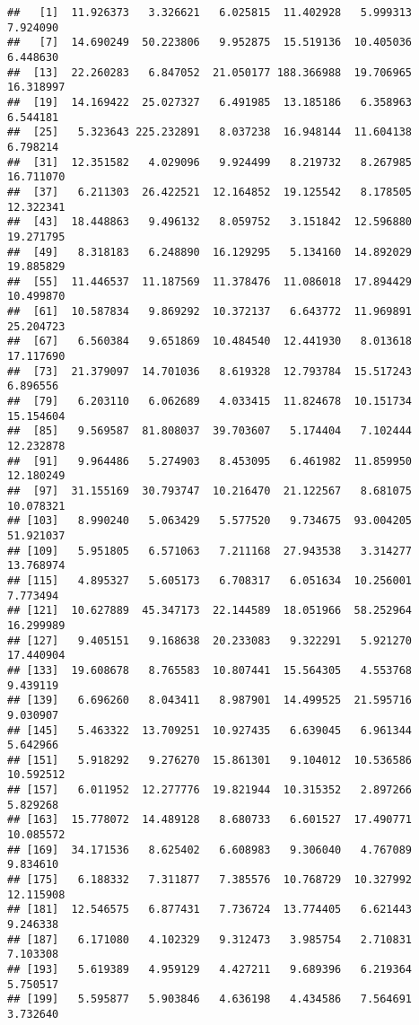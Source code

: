 \documentclass[
]{article}
\begin{document}
\begin{verbatim}
##   [1]  11.926373   3.326621   6.025815  11.402928   5.999313   7.924090
##   [7]  14.690249  50.223806   9.952875  15.519136  10.405036   6.448630
##  [13]  22.260283   6.847052  21.050177 188.366988  19.706965  16.318997
##  [19]  14.169422  25.027327   6.491985  13.185186   6.358963   6.544181
##  [25]   5.323643 225.232891   8.037238  16.948144  11.604138   6.798214
##  [31]  12.351582   4.029096   9.924499   8.219732   8.267985  16.711070
##  [37]   6.211303  26.422521  12.164852  19.125542   8.178505  12.322341
##  [43]  18.448863   9.496132   8.059752   3.151842  12.596880  19.271795
##  [49]   8.318183   6.248890  16.129295   5.134160  14.892029  19.885829
##  [55]  11.446537  11.187569  11.378476  11.086018  17.894429  10.499870
##  [61]  10.587834   9.869292  10.372137   6.643772  11.969891  25.204723
##  [67]   6.560384   9.651869  10.484540  12.441930   8.013618  17.117690
##  [73]  21.379097  14.701036   8.619328  12.793784  15.517243   6.896556
##  [79]   6.203110   6.062689   4.033415  11.824678  10.151734  15.154604
##  [85]   9.569587  81.808037  39.703607   5.174404   7.102444  12.232878
##  [91]   9.964486   5.274903   8.453095   6.461982  11.859950  12.180249
##  [97]  31.155169  30.793747  10.216470  21.122567   8.681075  10.078321
## [103]   8.990240   5.063429   5.577520   9.734675  93.004205  51.921037
## [109]   5.951805   6.571063   7.211168  27.943538   3.314277  13.768974
## [115]   4.895327   5.605173   6.708317   6.051634  10.256001   7.773494
## [121]  10.627889  45.347173  22.144589  18.051966  58.252964  16.299989
## [127]   9.405151   9.168638  20.233083   9.322291   5.921270  17.440904
## [133]  19.608678   8.765583  10.807441  15.564305   4.553768   9.439119
## [139]   6.696260   8.043411   8.987901  14.499525  21.595716   9.030907
## [145]   5.463322  13.709251  10.927435   6.639045   6.961344   5.642966
## [151]   5.918292   9.276270  15.861301   9.104012  10.536586  10.592512
## [157]   6.011952  12.277776  19.821944  10.315352   2.897266   5.829268
## [163]  15.778072  14.489128   8.680733   6.601527  17.490771  10.085572
## [169]  34.171536   8.625402   6.608983   9.306040   4.767089   9.834610
## [175]   6.188332   7.311877   7.385576  10.768729  10.327992  12.115908
## [181]  12.546575   6.877431   7.736724  13.774405   6.621443   9.246338
## [187]   6.171080   4.102329   9.312473   3.985754   2.710831   7.103308
## [193]   5.619389   4.959129   4.427211   9.689396   6.219364   5.750517
## [199]   5.595877   5.903846   4.636198   4.434586   7.564691   3.732640

\end{verbatim}
\end{document}
